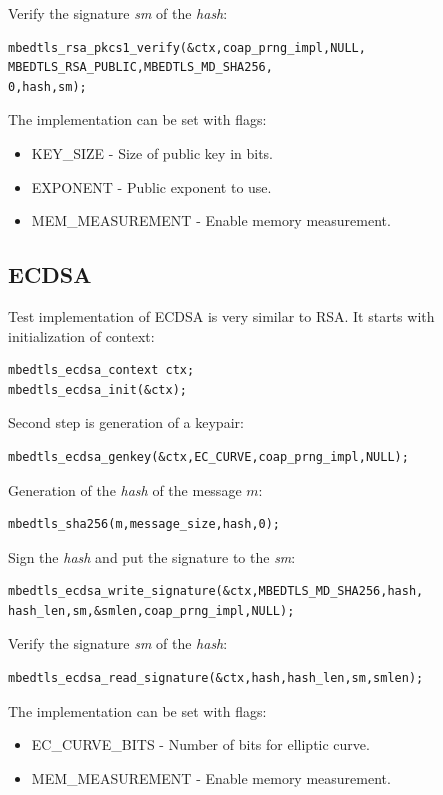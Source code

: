 \documentclass[thesis=M,english]{FITthesis}[2019/12/23]
\begin{document}
\noindent
Verify the signature \textit{sm} of the \textit{hash}:
\begin{lstlisting}[frame=single]
mbedtls_rsa_pkcs1_verify(&ctx,coap_prng_impl,NULL,
MBEDTLS_RSA_PUBLIC,MBEDTLS_MD_SHA256,
0,hash,sm);
\end{lstlisting}

\bigskip
\noindent
The implementation can be set with flags:
\begin{itemize}
\item	KEY\_SIZE - Size of public key in bits.
\item EXPONENT - Public exponent to use.
\item MEM\_MEASUREMENT - Enable memory measurement.
\end{itemize}

\subsection{ECDSA}
Test implementation of ECDSA is very similar to RSA. It starts with initialization of context:
\begin{lstlisting}[frame=single]
mbedtls_ecdsa_context ctx;
mbedtls_ecdsa_init(&ctx);
\end{lstlisting}

\noindent
Second step is generation of a keypair:
\begin{lstlisting}[frame=single]
mbedtls_ecdsa_genkey(&ctx,EC_CURVE,coap_prng_impl,NULL);
\end{lstlisting}

\noindent
Generation of the \textit{hash} of the message $m$:
\begin{lstlisting}[frame=single]
mbedtls_sha256(m,message_size,hash,0);
\end{lstlisting}

\noindent
Sign the \textit{hash} and put the signature to the \textit{sm}:
\begin{lstlisting}[frame=single]
mbedtls_ecdsa_write_signature(&ctx,MBEDTLS_MD_SHA256,hash,
hash_len,sm,&smlen,coap_prng_impl,NULL);
\end{lstlisting}

\noindent
Verify the signature \textit{sm} of the \textit{hash}:
\begin{lstlisting}[frame=single]
mbedtls_ecdsa_read_signature(&ctx,hash,hash_len,sm,smlen);
\end{lstlisting}

\bigskip
\noindent
The implementation can be set with flags:
\begin{itemize}
\item	EC\_CURVE\_BITS - Number of bits for elliptic curve.
\item MEM\_MEASUREMENT - Enable memory measurement.
\end{itemize}
\end{document}
